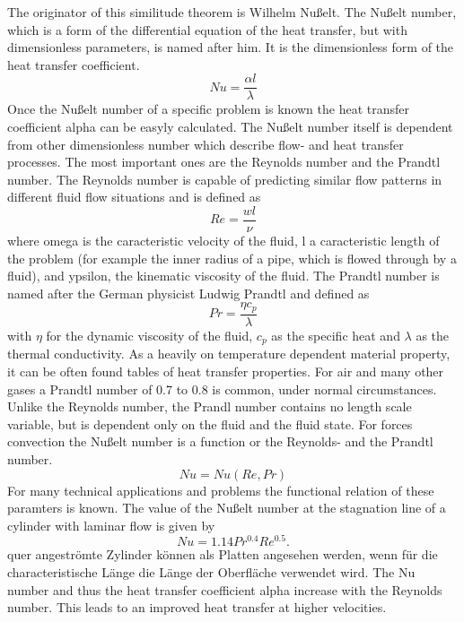 The originator of this similitude theorem is Wilhelm Nußelt. The Nußelt number, which is a form of the differential equation of the heat transfer, but with dimensionless parameters, is named after him. It is the dimensionless form of the heat transfer coefficient.
\begin{equation}
Nu = \frac{\alpha l}{\lambda}
\end{equation}
Once the Nußelt number of a specific problem is known the heat transfer coefficient alpha can be easyly calculated. The Nußelt number itself is dependent from other dimensionless number which describe flow- and heat transfer processes.
The most important ones are the Reynolds number and the Prandtl number. The Reynolds number is capable of predicting similar flow patterns in different fluid flow situations and is defined as 
\begin{equation}
Re = \frac{w l}{\nu}
\end{equation}
where omega is the caracteristic velocity of the fluid, l a caracteristic length of the problem (for example the inner radius of a pipe, which is flowed through by a fluid), and ypsilon, the kinematic viscosity of the fluid.
The Prandtl number is named after the German physicist Ludwig Prandtl and defined as
\begin{equation}
Pr = \frac{\eta c_p}{\lambda}
\end{equation}
with $\eta$ for the dynamic viscosity of the fluid, $c_p$ as the specific heat and $\lambda$ as the thermal conductivity. As a heavily on temperature dependent material property, it can be often found tables of heat transfer properties. For air and many other gases a Prandtl number of 0.7 to 0.8 is common, under normal circumstances. Unlike the Reynolds number, the Prandl number contains no length scale variable, but is dependent only on the fluid and the fluid state.
For forces convection the Nußelt number is a function or the Reynolds- and the Prandtl number.
\begin{equation}
Nu = Nu( Re, Pr )
\end{equation}
For many technical applications and problems the functional relation of these paramters is known. The value of the Nußelt number at the stagnation line of a cylinder with laminar flow is given by
\begin{equation}
Nu = 1.14Pr^{0.4} Re^{0.5}. 
\end{equation}
quer angeströmte Zylinder können als Platten angesehen werden, wenn für die characteristische Länge die Länge der Oberfläche verwendet wird. The Nu number and thus the heat transfer coefficient alpha increase with the Reynolds number. This leads to an improved heat transfer at higher velocities. 
